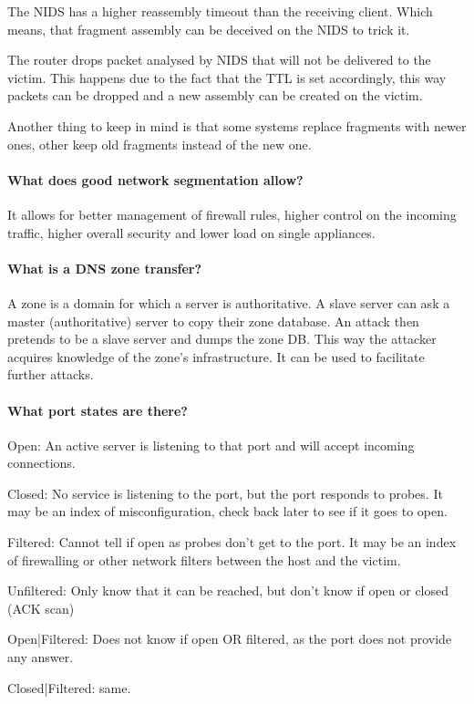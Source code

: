 The NIDS has a higher reassembly timeout than the receiving client. Which means, that fragment assembly can be deceived on the NIDS to trick it.

The router drops packet analysed by NIDS that will not be delivered to the victim. This happens due to the fact that the TTL is set accordingly, this way packets can be dropped and a new assembly can be created on the victim.

Another thing to keep in mind is that some systems replace fragments with newer ones, other keep old fragments instead of the new one.

\paragraph{What does good network segmentation allow?}
It allows for better management of firewall rules, higher control on the incoming traffic, higher overall security and lower load on single appliances.

\paragraph{What is a DNS zone transfer?}
A zone is a domain for which a server is authoritative. A slave server can ask a master (authoritative) server to copy their zone database. An attack then pretends to be a slave server and dumps the zone DB. This way the attacker acquires knowledge of the zone's infrastructure. It can be used to facilitate further attacks.

\paragraph{What port states are there?}
Open: An active server is listening to that port and will accept incoming connections.

Closed: No service is listening to the port, but the port responds to probes. It may be an index of misconfiguration, check back later to see if it goes to open.

Filtered: Cannot tell if open as probes don't get to the port. It may be an index of firewalling or other network filters between the host and the victim.

Unfiltered: Only know that it can be reached, but don't know if open or closed (ACK scan)

Open|Filtered: Does not know if open OR filtered, as the port does not provide any answer.

Closed|Filtered: same.

